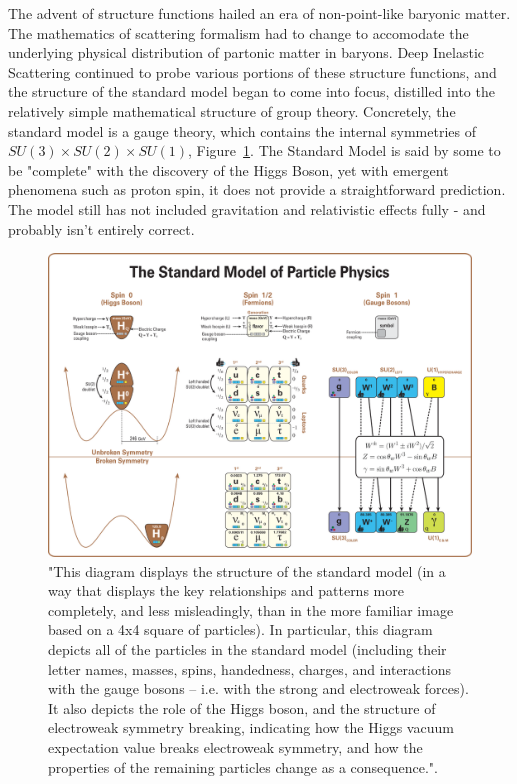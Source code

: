 The advent of structure functions hailed an era of non-point-like baryonic
matter. The mathematics of scattering formalism had to change to accomodate the
underlying physical distribution of partonic matter in baryons. Deep Inelastic
Scattering continued to probe various portions of these structure functions, and
the structure of the standard model began to come into focus, distilled into
the relatively simple mathematical structure of group theory. Concretely, the
standard model is a gauge theory, which contains the internal symmetries of
$SU(3) \times SU(2) \times SU(1)$, Figure~\ref{fig:standardmodel}. The Standard
Model is said by some to be "complete" with the discovery of the Higgs Boson,
yet with emergent phenomena such as proton spin, it does not provide a
straightforward prediction. The model still has not included gravitation and
relativistic effects fully - and probably isn't entirely correct.

\begin{figure}[ht]
	\centering
	\includegraphics[width=\linewidth]{../Chapter2/fig/standard_model_complete_lowres.png}
	\caption{
		"This diagram displays the structure of the standard model (in a way that
		displays the key relationships and patterns more completely, and less
		misleadingly, than in the more familiar image based on a 4x4 square of
		particles). In particular, this diagram depicts all of the particles in the
		standard model (including their letter names, masses, spins, handedness,
		charges, and interactions with the gauge bosons -- i.e. with the strong and
		electroweak forces). It also depicts the role of the Higgs boson, and the
		structure of electroweak symmetry breaking, indicating how the Higgs vacuum
		expectation value breaks electroweak symmetry, and how the properties of the
		remaining particles change as a consequence."\cite{Boyle2014}.
	}
	\label{fig:standardmodel}
\end{figure}


